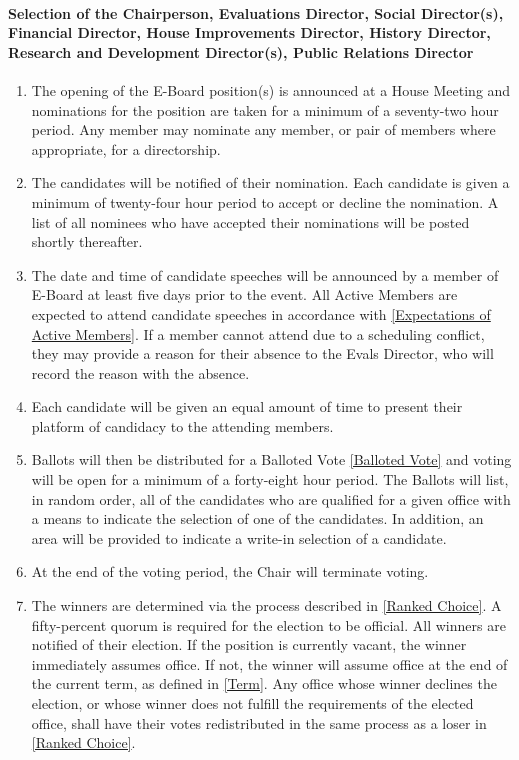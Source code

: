 \documentclass{article}
\newcommand{\asubsubsection}[1]{\paragraph{#1} \label{#1}}
\begin{document}
\asubsubsection{Selection of the Chairperson, Evaluations Director, Social Director(s), Financial Director, House Improvements Director, History Director,  Research and Development Director(s), Public Relations Director}
\begin{enumerate}
	\item The opening of the E-Board position(s) is announced at a House Meeting and nominations for the position are taken for a minimum of a seventy-two hour period.
	      Any member may nominate any member, or pair of members where appropriate, for a directorship.
	\item The candidates will be notified of their nomination.
	      Each candidate is given a minimum of twenty-four hour period to accept or decline the nomination.
	      A list of all nominees who have accepted their nominations will be posted shortly thereafter.
	\item The date and time of candidate speeches will be announced by a member of E-Board at least five days prior to the event.
	      All Active Members are expected to attend candidate speeches in accordance with \ref{Expectations of Active Members}.
	      If a member cannot attend due to a scheduling conflict, they may provide a reason for their absence to the Evals Director, who will record the reason with the absence.
	\item Each candidate will be given an equal amount of time to present their platform of candidacy to the attending members.
	\item Ballots will then be distributed for a Balloted Vote \ref{Balloted Vote} and voting will be open for a minimum of a forty-eight hour period.
	      The Ballots will list, in random order, all of the candidates who are qualified for a given office with a means to indicate the selection of one of the candidates.
	      In addition, an area will be provided to indicate a write-in selection of a candidate.
	\item At the end of the voting period, the Chair will terminate voting.
	\item The winners are determined via the process described in \ref{Ranked Choice}.
	      A fifty-percent quorum is required for the election to be official.
	      All winners are notified of their election.
	      If the position is currently vacant, the winner immediately assumes office.
	      If not, the winner will assume office at the end of the current term, as defined in \ref{Term}.
	      Any office whose winner declines the election, or whose winner does not fulfill the requirements of the elected office, shall have their votes redistributed in the same process as a loser in \ref{Ranked Choice}.
\end{enumerate}
\end{document}
